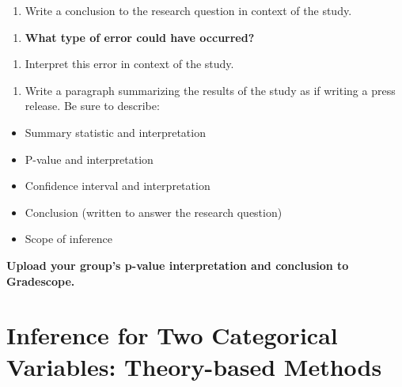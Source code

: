 \documentclass[
]{report}
\providecommand{\tightlist}{%
  \setlength{\itemsep}{0pt}\setlength{\parskip}{0pt}}
\begin{document}
\vspace{0.8in}

\begin{enumerate}
\def\labelenumi{\arabic{enumi}.}
\setcounter{enumi}{12}
\tightlist
\item
  Write a conclusion to the research question in context of the study.
\end{enumerate}

\vspace{0.8in}

\begin{enumerate}
\def\labelenumi{\arabic{enumi}.}
\setcounter{enumi}{13}
\tightlist
\item
  \textbf{What type of error could have occurred?}
\end{enumerate}

\vspace{0.2in}

\begin{enumerate}
\def\labelenumi{\arabic{enumi}.}
\setcounter{enumi}{14}
\tightlist
\item
  Interpret this error in context of the study.
\end{enumerate}

\vspace{0.8in}

\begin{enumerate}
\def\labelenumi{\arabic{enumi}.}
\setcounter{enumi}{15}
\tightlist
\item
  Write a paragraph summarizing the results of the study as if writing a press release. Be sure to describe:
\end{enumerate}

\begin{itemize}
\item
  Summary statistic and interpretation
\item
  P-value and interpretation
\item
  Confidence interval and interpretation
\item
  Conclusion (written to answer the research question)
\item
  Scope of inference
\end{itemize}

\textbf{Upload your group's p-value interpretation and conclusion to Gradescope.}

\vspace{2in}

\hypertarget{inference-for-two-categorical-variables-theory-based-methods}{%
\chapter{Inference for Two Categorical Variables: Theory-based Methods}\label{inference-for-two-categorical-variables-theory-based-methods}}
\end{document}
